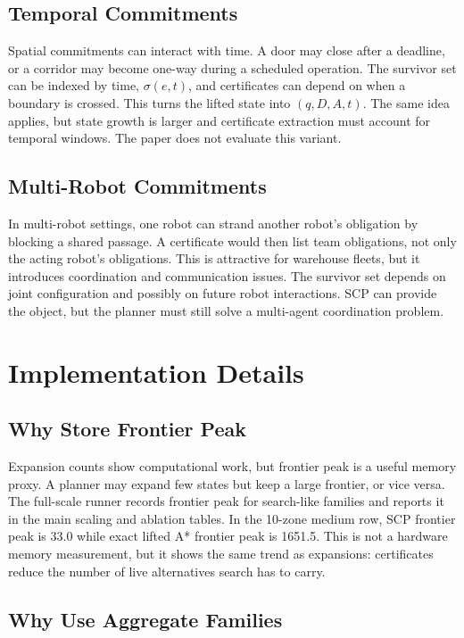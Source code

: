 \documentclass{article}
\newcommand{\survive}{\sigma}
\begin{document}
\subsection{Temporal Commitments}

Spatial commitments can interact with time. A door may close after a deadline, or a corridor may become one-way during a scheduled operation. The survivor set can be indexed by time, $\survive(e,t)$, and certificates can depend on when a boundary is crossed. This turns the lifted state into $(q,D,A,t)$. The same idea applies, but state growth is larger and certificate extraction must account for temporal windows. The paper does not evaluate this variant.

\subsection{Multi-Robot Commitments}

In multi-robot settings, one robot can strand another robot's obligation by blocking a shared passage. A certificate would then list team obligations, not only the acting robot's obligations. This is attractive for warehouse fleets, but it introduces coordination and communication issues. The survivor set depends on joint configuration and possibly on future robot interactions. SCP can provide the object, but the planner must still solve a multi-agent coordination problem.

\section{Implementation Details}

\subsection{Why Store Frontier Peak}

Expansion counts show computational work, but frontier peak is a useful memory proxy. A planner may expand few states but keep a large frontier, or vice versa. The full-scale runner records frontier peak for search-like families and reports it in the main scaling and ablation tables. In the 10-zone medium row, SCP frontier peak is 33.0 while exact lifted A* frontier peak is 1651.5. This is not a hardware memory measurement, but it shows the same trend as expansions: certificates reduce the number of live alternatives search has to carry.

\subsection{Why Use Aggregate Families}
\end{document}
